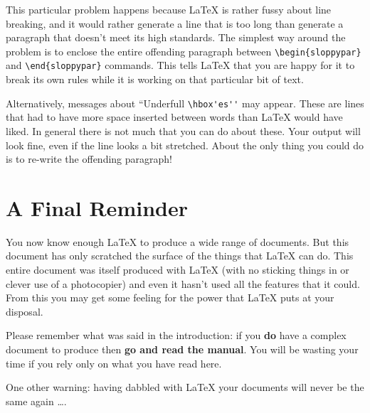 This particular problem happens because \LaTeX{} is rather fussy about line
breaking, and it would rather generate a line that is too long than generate a
paragraph that doesn't meet its high standards.  The simplest way around the
problem is to enclose the entire offending paragraph between
\verb|\begin{sloppypar}| and \verb|\end{sloppypar}| commands.  This tells
\LaTeX{} that you are happy for it to break its own rules while it is working on
that particular bit of text.

Alternatively, messages about ``Underfull \verb|\hbox'es''| may appear.
These are lines that had to have more space inserted between
words than \LaTeX{} would have liked.  In general there is not much that you
can do about these.  Your output will look fine, even if the line looks a bit
stretched.  About the only thing you could do is to re-write the offending
paragraph!

\section{A Final Reminder}

You now know enough \LaTeX{} to produce a wide range of documents.  But this
document has only scratched the surface of the
things that \LaTeX{} can do.  This entire document was itself produced with
\LaTeX{} (with no sticking things in or clever use of a photocopier) and even
it hasn't used all the features that it could.  From this you may get some
feeling for the power that \LaTeX{} puts at your disposal.

Please remember what was said in the introduction: if you {\bf do} have a
complex document to produce then {\bf go and read the manual}.  You will be
wasting your time if you rely only on what you have read here.

One other warning: having
dabbled with \LaTeX{} your documents will never be the same again \ldots.


